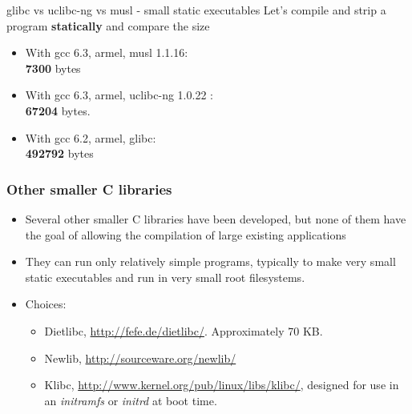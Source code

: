 \begin{frame}{glibc vs uclibc-ng vs musl - small static executables}
  Let's compile and strip a  program {\bf statically} and
compare the size
  \begin{itemize}
    \item With gcc 6.3, armel, musl 1.1.16:\\
          {\bf 7300} bytes
    \item With gcc 6.3, armel, uclibc-ng 1.0.22 :\\
          {\bf 67204} bytes.
    \item With gcc 6.2, armel, glibc:\\
          {\bf 492792} bytes
  \end{itemize}
\end{frame}

\begin{frame}
  \frametitle{Other smaller C libraries}
  \begin{itemize}
  \item Several other smaller C libraries have been developed, but
    none of them have the goal of allowing the compilation of large
    existing applications
  \item They can run only relatively simple programs,
	typically to make very small static executables and run
	in very small root filesystems.
  \item Choices:
    \begin{itemize}
    \item Dietlibc, \url{http://fefe.de/dietlibc/}. Approximately
      70 KB.
    \item Newlib, \url{http://sourceware.org/newlib/}
    \item Klibc, \url{http://www.kernel.org/pub/linux/libs/klibc/},
      designed for use in an {\em initramfs} or {\em initrd} at boot
      time.
    \end{itemize}
  \end{itemize}
\end{frame}
